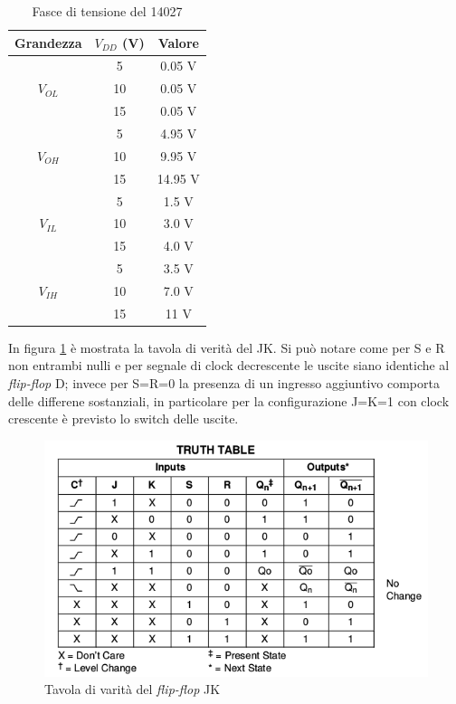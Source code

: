 \documentclass[journal, a4paper]{IEEEtran}
\begin{document}
\begin{table}[htp]
\centering
\caption{Fasce di tensione del 14027}
\label{tab:data}
\begin{tabular}{|c|c|c|}
  \hline
  Grandezza & $V_{DD}$ (V)& Valore \\
  \hline
           &  5  &  0.05 V \\ \cline{2-3}
  $V_{OL}$ & 10  &  0.05 V \\ \cline{2-3}
           & 15  &  0.05 V \\ 
  \hline 
           &  5  &  4.95 V \\ \cline{2-3}
  $V_{OH}$ & 10  &  9.95 V \\ \cline{2-3}
           & 15  & 14.95 V \\ 
  \hline \hline
           &  5  &  1.5 V \\ \cline{2-3}
  $V_{IL}$ & 10  &  3.0 V \\ \cline{2-3}
           & 15  &  4.0 V \\ 
  \hline 
           &  5  &  3.5 V \\ \cline{2-3}
  $V_{IH}$ & 10  &  7.0 V \\ \cline{2-3}
           & 15  &   11 V \\ 
  \hline
\end{tabular}
\end{table}

In figura \ref{fig:truth} è mostrata la tavola di verità del JK. Si può notare come per S e R non entrambi nulli e per segnale di clock decrescente le uscite siano identiche al \emph{flip-flop} D; invece per S=R=0 la presenza di un ingresso aggiuntivo comporta delle differene sostanziali, in particolare per la configurazione J=K=1 con clock crescente è previsto lo switch delle uscite.

\begin{figure}[htp]
\centering
\includegraphics[scale=.4]{truthtable}
\caption{Tavola di varità del \emph{flip-flop} JK}
\label{fig:truth}
\end{figure}
\end{document}
